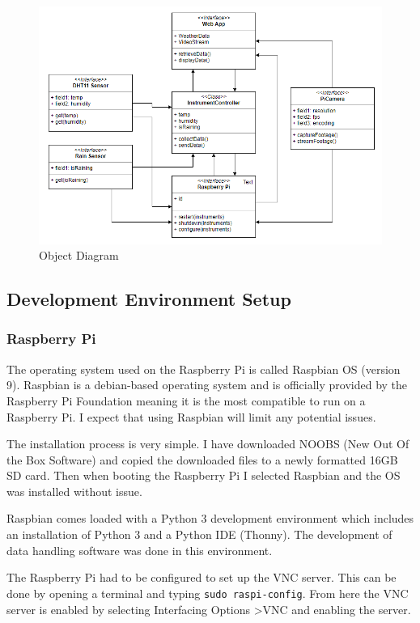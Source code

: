 \documentclass[10pt,a4paper]{article}
\begin{document}
\begin{figure}[H]
\centering
  \includegraphics[width=\linewidth]{images/objects.png}
  \caption{Object Diagram}
  \label{fig:objects}
\end{figure}

\subsection{Development Environment Setup}
\subsubsection{Raspberry Pi}
The operating system used on the Raspberry Pi is called Raspbian OS (version 9). Raspbian is a debian-based operating system and is officially provided by the Raspberry Pi Foundation meaning it is the most compatible to run on a Raspberry Pi. I expect that using Raspbian will limit any potential issues. 

The installation process is very simple. I have downloaded NOOBS (New Out Of the Box Software) and copied the downloaded files to a newly formatted 16GB SD card. Then when booting the Raspberry Pi I selected Raspbian and the OS was installed without issue. 

Raspbian comes loaded with a Python 3 development environment which includes an installation of Python 3 and a Python IDE (Thonny). The development of data handling software was done in this environment. 

The Raspberry Pi had to be configured to set up the VNC server. This can be done by opening a terminal and typing \texttt{sudo raspi-config}. From here the VNC server is enabled by selecting Interfacing Options \textgreater VNC and enabling the server.
\end{document}
